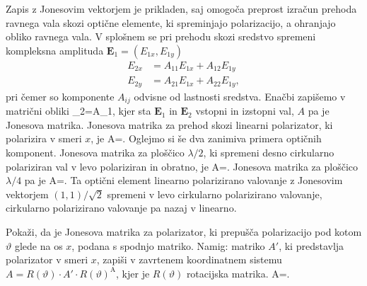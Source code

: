 Zapis z Jonesovim vektorjem je prikladen, saj omogoča preprost izračun
prehoda ravnega vala skozi optične elemente, ki spreminjajo polarizacijo,
a ohranjajo obliko ravnega vala. V splošnem se pri prehodu skozi
sredstvo spremeni kompleksna amplituda $\mathbf{E}_1 = (E_{1x}, E_{1y})$
\begin{align}
E_{2x} & =A_{11}E_{1x}+A_{12}E_{1y}\\
E_{2y} & =A_{21}E_{1x}+A_{22}E_{1y},
\end{align}
pri čemer so komponente $A_{ij}$ odvisne od lastnosti sredstva. Enačbi zapišemo 
v matrični obliki
\beq
{}_{2}=A\cdot{}_{1},
\eeq
kjer sta $\mathbf{E}_{1}$ in $\mathbf{E}_{2}$
vstopni in izstopni val, $A$ pa je Jonesova
matrika. Jonesova matrika za prehod skozi linearni polarizator, ki
polarizira v smeri $x$, je
\beq
A=\left[\begin{array}{cc}
1 & 0\\
0 & 0
\end{array}\right].
\eeq
Oglejmo si še dva zanimiva primera optičnih komponent.
Jonesova matrika za  ploščico $\lambda/2$,
ki spremeni desno cirkularno polariziran val v levo polariziran in obratno,
je
\beq
A=\left[\begin{array}{cc}
1 & 0\\
0 & -1
\end{array}\right].
\eeq
Jonesova matrika za  ploščico $\lambda/4$ pa je 
\beq
A=\left[\begin{array}{cc}
1 & 0\\
0 & i
\end{array}\right].
\eeq
Ta optični element linearno polarizirano valovanje z Jonesovim vektorjem $(1,1)/\sqrt{2}$
spremeni v levo cirkularno polarizirano valovanje, cirkularno polarizirano
valovanje pa nazaj v linearno. 

\begin{definition}
Pokaži, da je Jonesova matrika za polarizator,
ki prepušča polarizacijo pod kotom $\vartheta$ glede na os $x$, podana s spodnjo matriko. 
Namig: matriko $A'$, ki predstavlja polarizator v smeri $x$, zapiši v zavrtenem
koordinatnem sistemu $A=R(\vartheta) \cdot {A'}\cdot R(\vartheta)^\textrm{A}$, 
kjer je $R(\vartheta)$ rotacijska matrika.
\beq
A=.
\eeq

\end{definition}

